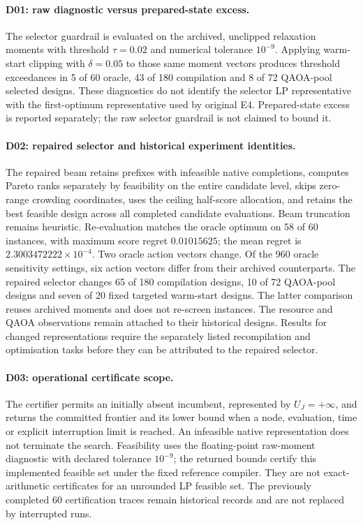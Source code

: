 
\paragraph{D01: raw diagnostic versus prepared-state excess.}
The selector guardrail is evaluated on the archived, unclipped relaxation
moments with threshold $\tau=0.02$ and numerical tolerance $10^{-9}$.
Applying warm-start clipping with $\delta=0.05$ to those same moment vectors
produces threshold exceedances in 5 of 60 oracle, 43 of 180 compilation and
8 of 72 QAOA-pool selected designs. These diagnostics do not identify the
selector LP representative with the first-optimum representative used by
original E4. Prepared-state excess is reported separately; the raw selector
guardrail is not claimed to bound it.

\paragraph{D02: repaired selector and historical experiment identities.}
The repaired beam retains prefixes with infeasible native completions, computes
Pareto ranks separately by feasibility on the entire candidate level, skips
zero-range crowding coordinates, uses the ceiling half-score allocation, and
retains the best feasible design across all completed candidate evaluations.
Beam truncation remains heuristic. Re-evaluation matches the oracle optimum on
58 of 60 instances, with maximum score regret $0.01015625$; the mean regret is
$2.3003472222\times10^{-4}$. Two oracle action vectors change. Of the 960
oracle sensitivity settings, six action vectors differ from their archived
counterparts. The repaired selector changes 65 of 180 compilation designs,
10 of 72 QAOA-pool designs and seven of 20 fixed targeted warm-start designs.
The latter comparison reuses archived moments and does not re-screen instances.
The resource and QAOA observations remain attached to their historical designs.
Results for changed representations require the separately listed recompilation
and optimisation tasks before they can be attributed to the repaired selector.

\paragraph{D03: operational certificate scope.}
The certifier permits an initially absent incumbent, represented by
$U_J=+\infty$, and returns the committed frontier and its lower bound when a
node, evaluation, time or explicit interruption limit is reached. An infeasible
native representation does not terminate the search. Feasibility uses the
floating-point raw-moment diagnostic with declared tolerance $10^{-9}$;
the returned bounds certify this implemented feasible set under the fixed
reference compiler. They are not exact-arithmetic certificates for an
unrounded LP feasible set. The previously completed 60 certification traces
remain historical records and are not replaced by interrupted runs.

